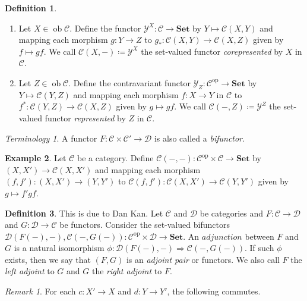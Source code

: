 \documentclass[10pt,letterpaper,cm]{nupset}
\theoremstyle{definition}
\newtheorem{definition}{Definition}
\newtheorem{exmp}[definition]{Example}
\theoremstyle{theorem}
\theoremstyle{remark}
\newtheorem{remark}{Remark}
\newtheorem*{term}{Terminology}
\newcommand{\1}{\mathbf{1}}
\renewcommand{\c}{\mathscr{C}}
\renewcommand{\d}{\mathscr{D}}
\newcommand{\y}{\mathscr{Y}}
\newcommand{\0}{\vec 0}
\DeclareMathOperator{\op}{op}
\DeclareMathOperator{\ob}{ob}
\begin{document}
\begin{definition} $ $
\begin{enumerate}
\item Let $X \in \ob \c$. Define the functor $\y^X : \c \to \mathbf{Set}$ by $Y \mapsto \c(X, Y)$  and mapping each morphism $g: Y \to Z$ to $g_{\ast} : \c(X, Y) \to \c(X, Z)$ given by $f \mapsto gf$. We call $\c(X, -)\coloneqq\y^X$ the set-valued functor \textit{corepresented} by $X$ in $\c$.
\item Let $Z \in \ob \c$. Define the contravariant functor $\y_Z: \c^{\op} \to \mathbf{Set}$ by $Y \mapsto \c(Y, Z)$ and mapping each morphism $f: X \to Y$ in $\c$ to $f^{\ast} : \c(Y, Z) \to \c(X, Z)$ given by $g\mapsto gf$. We call $\c(-, Z)\coloneqq \y^Z$ the set-valued functor \textit{represented} by $Z$ in $\c$.
\end{enumerate}
\end{definition}

\begin{term}
A functor $F: \c \times \c' \to \d$ is also called a \textit{bifunctor}.
\end{term}

\begin{exmp}
Let $\c$ be a category. Define $\c(-, -): \c^{\op} \times \c \to \mathbf{Set}$ by $(X, X') \to \c(X, X')$ and mapping each morphism $(f, f') : (X, X') \to (Y, Y')$ to $\c(f, f') : \c(X, X') \to \c(Y, Y')$ given by $g \mapsto f'gf$.
\end{exmp}

\begin{definition}
This is due to Dan Kan. Let $\c$ and $\d$ be categories and $F : \c \to \d$ and $G: \d \to \c$ be functors. Consider the set-valued bifunctors $ \d(F(-), -), \c(-, G(-)): \c^{\op} \times \d \to \mathbf{Set}$. An $\textit{adjunction}$ between $F$ and $G$ is a natural isomorphism $\phi : \d(F(-), -) \Rightarrow \c(-, G(-))$. If such $\phi$ exists, then we say that $(F, G)$ is an \textit{adjoint pair} or functors. We also call $F$ the \textit{left adjoint} to $G$ and $G$ the \textit{right adjoint} to $F$. 

\begin{remark}
For each $c: X' \to X$ and $d: Y \to Y'$, the following commutes.

\begin{center}
\end{center}

\end{remark}

\end{definition}
\end{document}
